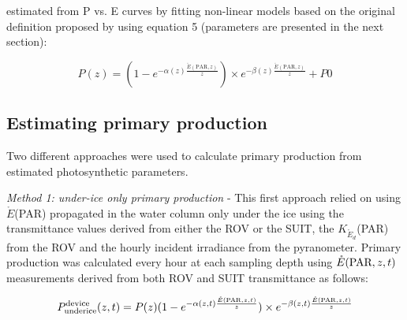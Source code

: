 \documentclass[draft]{agujournal2018}
\newcommand{\kdparscalar}{\ensuremath{K_{\mathring{E}_d}}(\textnormal{PAR})}
\newcommand{\eparscalar}{\ensuremath{\mathring{E}}(\textnormal{PAR})}
\newcommand{\ppundericedevice}{\ensuremath{P_{\textnormal{\scriptsize underice}}^{\textnormal{\scriptsize device}}}}
\begin{document}
estimated from P vs. E curves by fitting non-linear models based on the original definition proposed by \citet{Platt1980} using equation 5 (parameters are presented in the next section): 

\begin{linenomath*}
	\begin{equation}
P(z) = (1 - e^{-\alpha(z)\frac{\mathring{E}(\text{PAR}, z)}{z}}) \times e^{-\beta(z)\frac{\mathring{E}(\text{PAR}, z)}{z}} + P0
\end{equation}
\end{linenomath*}

\subsection{Estimating primary production}

Two different approaches were used to calculate primary production from estimated photosynthetic parameters.

\textit{Method 1: under-ice only primary production} - This first approach relied on using \eparscalar{} propagated in the water column only under the ice using the transmittance values derived from either the ROV or the SUIT, the \kdparscalar{} from the ROV and the hourly incident irradiance from the pyranometer. Primary production was calculated every hour at each sampling depth using $\mathring{E}(\textnormal{PAR}, z, t)$ measurements derived from both ROV and SUIT transmittance as follows:

\begin{linenomath*}
    \begin{equation}
		\ppundericedevice{}(z,t) = P(z)(1 - e^{-\alpha(z,t)\frac{\mathring{E}(\text{PAR}, z, t)}{z}}) \times e^{-\beta(z,t)\frac{\mathring{E}(\text{PAR}, z, t)}{z}}
	\end{equation}
\end{linenomath*}
\end{document}
